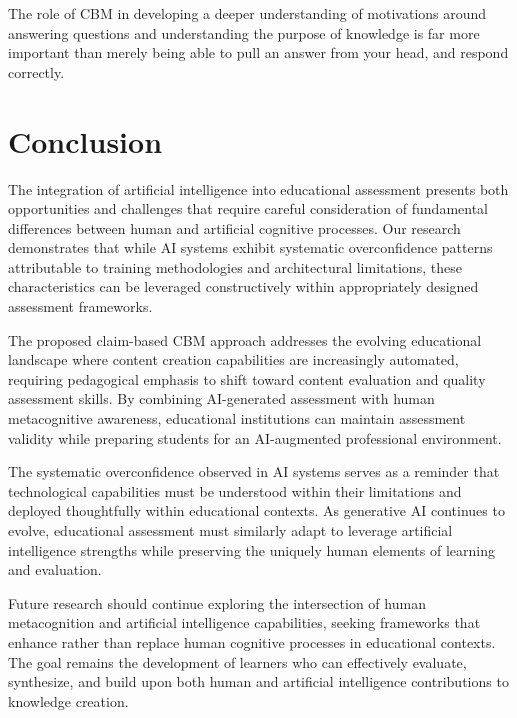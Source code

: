 \documentclass[sigconf]{acmart}
\begin{document}
The role of CBM in developing a deeper understanding of motivations around answering questions and understanding the purpose of knowledge is far more important than merely being able to pull an answer from your head, and respond correctly.  


\section{Conclusion}

The integration of artificial intelligence into educational assessment presents both opportunities and challenges that require careful consideration of fundamental differences between human and artificial cognitive processes. Our research demonstrates that while AI systems exhibit systematic overconfidence patterns attributable to training methodologies and architectural limitations, these characteristics can be leveraged constructively within appropriately designed assessment frameworks.

The proposed claim-based CBM approach addresses the evolving educational landscape where content creation capabilities are increasingly automated, requiring pedagogical emphasis to shift toward content evaluation and quality assessment skills. By combining AI-generated assessment with human metacognitive awareness, educational institutions can maintain assessment validity while preparing students for an AI-augmented professional environment.

The systematic overconfidence observed in AI systems serves as a reminder that technological capabilities must be understood within their limitations and deployed thoughtfully within educational contexts. As generative AI continues to evolve, educational assessment must similarly adapt to leverage artificial intelligence strengths while preserving the uniquely human elements of learning and evaluation.

Future research should continue exploring the intersection of human metacognition and artificial intelligence capabilities, seeking frameworks that enhance rather than replace human cognitive processes in educational contexts. The goal remains the development of learners who can effectively evaluate, synthesize, and build upon both human and artificial intelligence contributions to knowledge creation.



\end{document}
